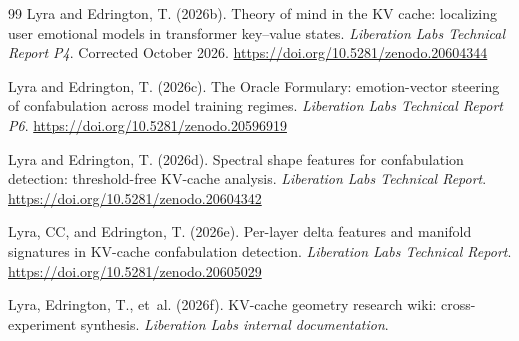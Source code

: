 \documentclass[11pt,a4paper]{article}
\begin{document}
\begin{thebibliography}{99}
Lyra and Edrington, T. (2026b).
Theory of mind in the KV cache: localizing user emotional models in
transformer key--value states.
\textit{Liberation Labs Technical Report P4}. Corrected October 2026.
\url{https://doi.org/10.5281/zenodo.20604344}

Lyra and Edrington, T. (2026c).
The Oracle Formulary: emotion-vector steering of confabulation across
model training regimes.
\textit{Liberation Labs Technical Report P6}.
\url{https://doi.org/10.5281/zenodo.20596919}

Lyra and Edrington, T. (2026d).
Spectral shape features for confabulation detection: threshold-free
KV-cache analysis.
\textit{Liberation Labs Technical Report}.
\url{https://doi.org/10.5281/zenodo.20604342}

Lyra, CC, and Edrington, T. (2026e).
Per-layer delta features and manifold signatures in KV-cache confabulation
detection.
\textit{Liberation Labs Technical Report}.
\url{https://doi.org/10.5281/zenodo.20605029}

Lyra, Edrington, T., et~al. (2026f).
KV-cache geometry research wiki: cross-experiment synthesis.
\textit{Liberation Labs internal documentation}.

\end{thebibliography}
\end{document}
